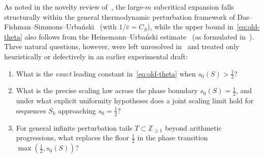 \documentclass[11pt]{article}
\theoremstyle{definition}
\theoremstyle{remark}
\newcommand{\Z}{\mathbb{Z}}
\begin{document}
As noted in the novelty review of~\cite{Paper2}, the large-$m$ subcritical
expansion falls structurally within the general thermodynamic perturbation
framework of Das--Fishman--Simmons--Urba\'nski~\cite[Theorem~4.1]{DFSU}
(with $1/\bar c=C_S$), while the upper bound in~\eqref{eq:old-theta} also
follows from the Heinemann--Urba\'nski estimate~\cite{HU02} (as formulated
in~\cite[Theorem~2.4]{CLU}). Three natural questions, however, were left
unresolved in~\cite{Paper2} and treated only heuristically or defectively in
an earlier experimental draft:
\begin{enumerate}[label=\textup{(Q\arabic*)},leftmargin=2.4em]
\item What is the \emph{exact} leading constant in~\eqref{eq:old-theta} when
$s_0(S)>\tfrac12$?
\item What is the precise scaling law across the phase boundary
$s_0(S)=\tfrac12$, and under what explicit uniformity hypotheses does a joint
scaling limit hold for sequences $S_k$ approaching $s_0=\tfrac12$?
\item For general infinite perturbation tails $T\subset\Z_{\ge1}$ beyond
arithmetic progressions, what replaces the floor $\tfrac12$ in the phase
transition $\max(\tfrac12,s_0(S))$?
\end{enumerate}
\end{document}
